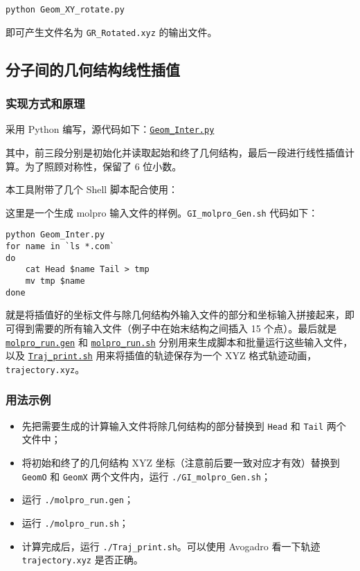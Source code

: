 \documentclass[a4paper,openany]{book}
\begin{document}
\begin{shaded}\begin{verbatim}
python Geom_XY_rotate.py
\end{verbatim}\end{shaded}

即可产生文件名为 \texttt{GR\_Rotated.xyz} 的输出文件。

\subsection{分子间的几何结构线性插值}

\subsubsection{实现方式和原理}

采用 Python 编写，源代码如下：\href{https://github.com/GFrankenstein/UM/blob/master/pdf/src/GI/Geom\_Inter.py}{\texttt{Geom\_Inter.py}}

其中，前三段分别是初始化并读取起始和终了几何结构，最后一段进行线性插值计算。为了照顾对称性，保留了 6 位小数。

本工具附带了几个 Shell 脚本配合使用：

这里是一个生成 molpro 输入文件的样例。\texttt{GI\_molpro\_Gen.sh} 代码如下：

\begin{shaded}\begin{verbatim}
python Geom_Inter.py
for name in `ls *.com`
do
    cat Head $name Tail > tmp
    mv tmp $name
done
\end{verbatim}\end{shaded}

就是将插值好的坐标文件与除几何结构外输入文件的部分和坐标输入拼接起来，即可得到需要的所有输入文件（例子中在始末结构之间插入 15 个点）。最后就是 \href{https://github.com/GFrankenstein/UM/blob/master/pdf/src/GI/molpro\_run.gen}{\texttt{molpro\_run.gen}} 和 \href{https://github.com/GFrankenstein/UM/blob/master/pdf/src/GI/molpro\_run.sh}{\texttt{molpro\_run.sh}} 分别用来生成脚本和批量运行这些输入文件，以及 \href{https://github.com/GFrankenstein/UM/blob/master/pdf/src/GI/Traj\_print.sh}{\texttt{Traj\_print.sh}} 用来将插值的轨迹保存为一个 XYZ 格式轨迹动画，\texttt{trajectory.xyz}。

\subsubsection{用法示例}

\begin{itemize}
\item
  先把需要生成的计算输入文件将除几何结构的部分替换到 \texttt{Head} 和 \texttt{Tail} 两个文件中；
\item
  将初始和终了的几何结构 XYZ 坐标（注意前后要一致对应才有效）替换到 \texttt{GeomO} 和 \texttt{GeomX} 两个文件内，运行 \texttt{./GI\_molpro\_Gen.sh}；
\item
  运行 \texttt{./molpro\_run.gen}；
\item
  运行 \texttt{./molpro\_run.sh}；
\item
  计算完成后，运行 \texttt{./Traj\_print.sh}。可以使用 Avogadro 看一下轨迹 \texttt{trajectory.xyz} 是否正确。
\end{itemize}
\end{document}
